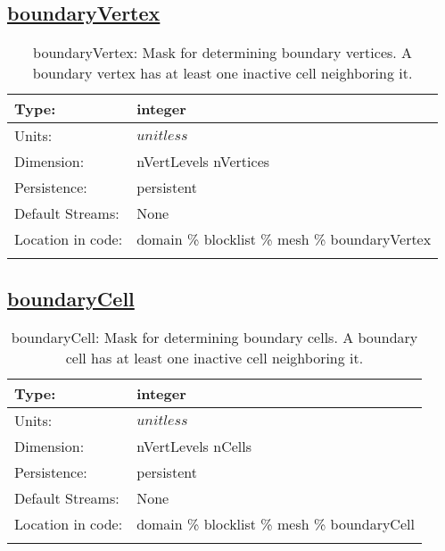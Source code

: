 \subsection[boundaryVertex]{\hyperref[sec:var_tab_mesh]{boundaryVertex}}
\label{subsec:var_sec_mesh_boundaryVertex}
\begin{center}
\begin{longtable}{| p{2.0in} | p{4.0in} |}
        \hline 
        Type: & integer \\
        \hline 
        Units: & $unitless$ \\
        \hline 
        Dimension: & nVertLevels nVertices \\
        \hline 
        Persistence: & persistent \\
        \hline 
		 Default Streams: & None \\
        \hline 
		 Location in code: & domain \% blocklist \% mesh \% boundaryVertex \\
		 \hline 
    \caption{boundaryVertex: Mask for determining boundary vertices. A boundary vertex has at least one inactive cell neighboring it.}
\end{longtable}
\end{center}
\subsection[boundaryCell]{\hyperref[sec:var_tab_mesh]{boundaryCell}}
\label{subsec:var_sec_mesh_boundaryCell}
\begin{center}
\begin{longtable}{| p{2.0in} | p{4.0in} |}
        \hline 
        Type: & integer \\
        \hline 
        Units: & $unitless$ \\
        \hline 
        Dimension: & nVertLevels nCells \\
        \hline 
        Persistence: & persistent \\
        \hline 
		 Default Streams: & None \\
        \hline 
		 Location in code: & domain \% blocklist \% mesh \% boundaryCell \\
		 \hline 
    \caption{boundaryCell: Mask for determining boundary cells. A boundary cell has at least one inactive cell neighboring it.}
\end{longtable}
\end{center}
